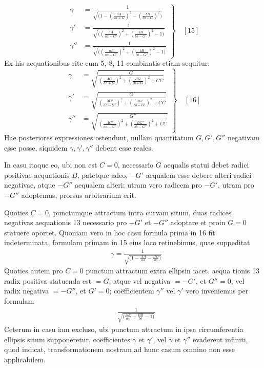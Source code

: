 \[
\left.\begin{aligned}
\gamma&=\frac{1}{\surd{\bigl(1-(\frac{aA}{aa+G})^2-(\frac{bB}{bb+G})^2\bigr)}}\\[9pt]
\gamma'&=\frac{1}{\surd{\bigl((\frac{aA}{aa-G'})^2+(\frac{bB}{bb-G'})^2-1\bigr)}}\\[9pt]
\gamma''&=\frac{1}{\surd{\bigl((\frac{aA}{aa-G''})^2+(\frac{bB}{bb-G''})^2-1\bigr)}}
\end{aligned}\right\}\quad[15]
\]
Ex his aequationibus rite cum 5, 8, 11 combinatis etiam sequitur:
\[
\left.\begin{aligned}
\gamma&=\surd{\frac{G}{(\frac{AG}{aa+G})^2+(\frac{BG}{bb+G})^2+CC}}\\[9pt]
\gamma'&=\surd{\frac{G'}{(\frac{AG'}{aa-G'})^2+(\frac{BG'}{bb-G'})^2+CC}}\\[9pt]
\gamma''&=\surd{\frac{G''}{(\frac{AG''}{aa-G''})^2+(\frac{BG''}{bb-G''})^2+CC}}
\end{aligned}\right\}\quad[16]
\]
Hae posteriores expressiones ostendunt, nullam quantitatum $G,G',G''$ negativam esse posse, siquidem $\gamma,\gamma',\gamma''$ debent esse reales.

In casu itaque eo, ubi non est $C=0$, necessario $G$ aequalis statui debet radici positivae aequationis $B$, patetque adeo, $-G'$ aequalem esse debere
alteri radici negativae, atque $-G''$ aequalem alteri; utram vero radicem pro
$-G'$, utram pro $-G''$ adoptemus, prorsus arbitrarium erit.

Quoties $C=0$, punctumque attractum intra curvam situm, duas radices
negativas aequationis 13 necessario pro $-G'$ et $-G''$ adoptare et proin $G=0$
statuere oportet. Quoniam vero in hoc casu formula prima in 16 fit indeterminata, formulam primam in 15 eius loco retinebimus, quae suppeditat
\[
\begin{aligned}
&\gamma=\frac{1}{\surd{\bigl(1-\frac{AA}{aa}-\frac{BB}{bb}\bigr)}}
\end{aligned}
\]
Quoties autem pro $C=0$ punctum attractum extra ellipsin iacet. aequa%
tionis 13 radix positiva statuenda est $=G$, atque vel negativa $=-G'$, et
$G''=0$, vel radix negativa $=-G''$, et $G'=0$; coëfficientem $\gamma''$ vel $\gamma'$ vero
inveniemus per formulam
\[
\begin{aligned}
&\frac{1}{\surd{\bigl(\frac{AA}{aa}+\frac{BB}{bb}-1\bigr)}}
\end{aligned}
\]
Ceterum in casu iam excluso, ubi punctum attractum in ipsa circumferentia ellipsis situm supponeretur, coëfficientes $\gamma$ et $\gamma'$, vel $\gamma$ et $\gamma''$ evaderent infiniti,
quod indicat, transformationem nostram ad hunc casum omnino non esse applicabilem.

